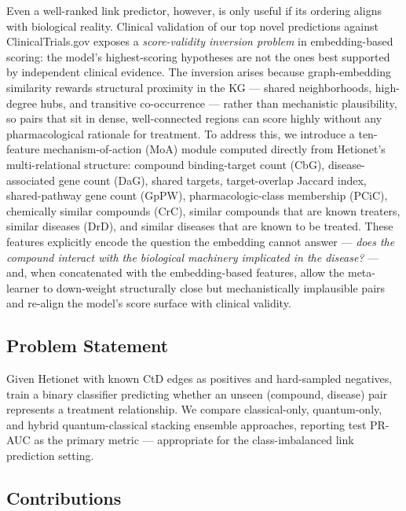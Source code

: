 \documentclass[twocolumn,10pt]{article}
\begin{document}
Even a well-ranked link predictor, however, is only useful if its ordering aligns with biological reality. Clinical validation of our top novel predictions against ClinicalTrials.gov exposes a \textit{score-validity inversion problem} in embedding-based scoring: the model's highest-scoring hypotheses are not the ones best supported by independent clinical evidence. The inversion arises because graph-embedding similarity rewards structural proximity in the KG --- shared neighborhoods, high-degree hubs, and transitive co-occurrence --- rather than mechanistic plausibility, so pairs that sit in dense, well-connected regions can score highly without any pharmacological rationale for treatment. To address this, we introduce a ten-feature mechanism-of-action (MoA) module computed directly from Hetionet's multi-relational structure: compound binding-target count (CbG), disease-associated gene count (DaG), shared targets, target-overlap Jaccard index, shared-pathway gene count (GpPW), pharmacologic-class membership (PCiC), chemically similar compounds (CrC), similar compounds that are known treaters, similar diseases (DrD), and similar diseases that are known to be treated. These features explicitly encode the question the embedding cannot answer --- \textit{does the compound interact with the biological machinery implicated in the disease?} --- and, when concatenated with the embedding-based features, allow the meta-learner to down-weight structurally close but mechanistically implausible pairs and re-align the model's score surface with clinical validity.

\subsection{Problem Statement}

Given Hetionet with known CtD edges as positives and hard-sampled negatives, train a binary classifier predicting whether an unseen (compound, disease) pair represents a treatment relationship. We compare classical-only, quantum-only, and hybrid quantum-classical stacking ensemble approaches, reporting test PR-AUC as the primary metric --- appropriate for the class-imbalanced link prediction setting.

\subsection{Contributions}
\end{document}
